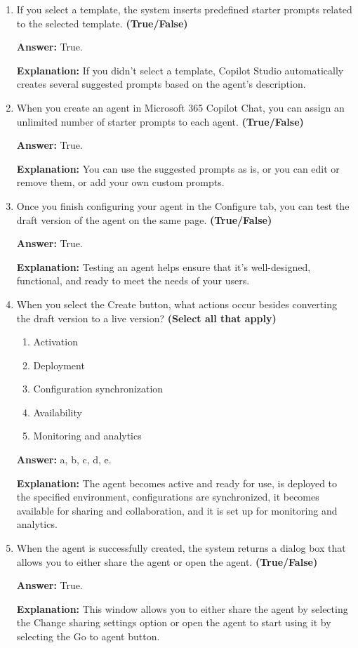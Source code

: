 \documentclass[10pt]{article}
\begin{document}
\begin{enumerate}[leftmargin=*]
\textbf{Explanation:} Starter prompts are predefined suggestions or questions designed to help users initiate a task or conversation related to your agent.

\item If you select a template, the system inserts predefined starter prompts related to the selected template. \textbf{(True/False)}

\textbf{Answer:} True.

\textbf{Explanation:} If you didn’t select a template, Copilot Studio automatically creates several suggested prompts based on the agent’s description.

\item When you create an agent in Microsoft 365 Copilot Chat, you can assign an unlimited number of starter prompts to each agent. \textbf{(True/False)}

\textbf{Answer:} True.

\textbf{Explanation:} You can use the suggested prompts as is, or you can edit or remove them, or add your own custom prompts.

\item Once you finish configuring your agent in the Configure tab, you can test the draft version of the agent on the same page. \textbf{(True/False)}

\textbf{Answer:} True.

\textbf{Explanation:} Testing an agent helps ensure that it’s well-designed, functional, and ready to meet the needs of your users.

\item When you select the Create button, what actions occur besides converting the draft version to a live version? \textbf{(Select all that apply)}

\begin{enumerate}[label=\alph*., leftmargin=1.5em]
\item Activation
\item Deployment
\item Configuration synchronization
\item Availability
\item Monitoring and analytics
\end{enumerate}

\textbf{Answer:} a, b, c, d, e.

\textbf{Explanation:} The agent becomes active and ready for use, is deployed to the specified environment, configurations are synchronized, it becomes available for sharing and collaboration, and it is set up for monitoring and analytics.

\item When the agent is successfully created, the system returns a dialog box that allows you to either share the agent or open the agent. \textbf{(True/False)}

\textbf{Answer:} True.

\textbf{Explanation:} This window allows you to either share the agent by selecting the Change sharing settings option or open the agent to start using it by selecting the Go to agent button.

\end{enumerate}
\end{document}
